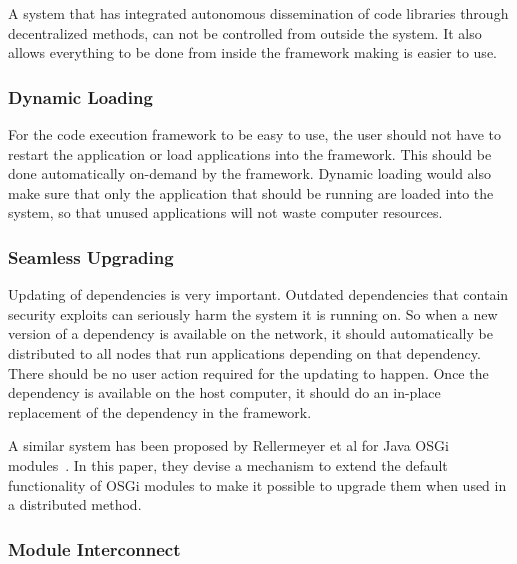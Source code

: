 A system that has integrated autonomous dissemination of code libraries through decentralized methods, can not be controlled from outside the system. It also allows everything to be done from inside the framework making is easier to use.

\subsubsection{\textbf{Dynamic Loading}}

For the code execution framework to be easy to use, the user should not have to restart the application or load applications into the framework. This should be done automatically on-demand by the framework. Dynamic loading would also make sure that only the application that should be running are loaded into the system, so that unused applications will not waste computer resources.


\subsubsection{\textbf{Seamless Upgrading}}

Updating of dependencies is very important. Outdated dependencies that contain security exploits can seriously harm the system it is running on. So when a new version of a dependency is available on the network, it should automatically be distributed to all nodes that run applications depending on that dependency. There should be no user action required for the updating to happen. Once the dependency is available on the host computer, it should do an in-place replacement of the dependency in the framework.

A similar system has been proposed by Rellermeyer et al for Java OSGi modules~\cite{rellermeyer2008consistently}. In this paper, they devise a mechanism to extend the default functionality of OSGi modules to make it possible to upgrade them when used in a distributed method.

\subsubsection{\textbf{Module Interconnect}}

